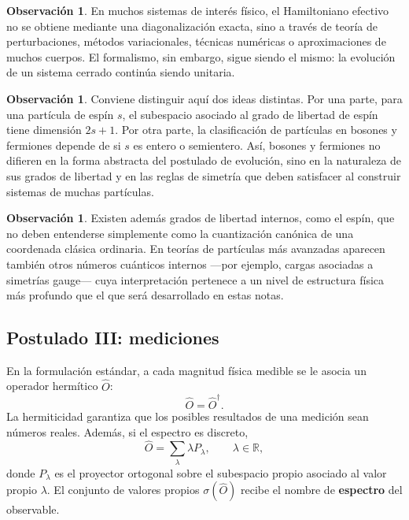 \documentclass[12pt,a4paper]{article}
\theoremstyle{definition}
\newtheorem{observacion}[definicion]{Observación}
\theoremstyle{plain}
\theoremstyle{remark}
\newcommand{\R}{\mathbb{R}}
\providecommand{\op}[1]{\hat{#1}}
\begin{document}
\begin{observacion}
En muchos sistemas de interés físico, el Hamiltoniano efectivo no se obtiene mediante una diagonalización exacta, sino a través de teoría de perturbaciones, métodos variacionales, técnicas numéricas o aproximaciones de muchos cuerpos. El formalismo, sin embargo, sigue siendo el mismo: la evolución de un sistema cerrado continúa siendo unitaria.
\end{observacion}

\begin{observacion}
Conviene distinguir aquí dos ideas distintas. Por una parte, para una partícula de espín $s$, el subespacio asociado al grado de libertad de espín tiene dimensión $2s+1$. Por otra parte, la clasificación de partículas en bosones y fermiones depende de si $s$ es entero o semientero. Así, bosones y fermiones no difieren en la forma abstracta del postulado de evolución, sino en la naturaleza de sus grados de libertad y en las reglas de simetría que deben satisfacer al construir sistemas de muchas partículas.
\end{observacion}

\begin{observacion}
Existen además grados de libertad internos, como el espín, que no deben entenderse simplemente como la cuantización canónica de una coordenada clásica ordinaria. En teorías de partículas más avanzadas aparecen también otros números cuánticos internos ---por ejemplo, cargas asociadas a simetrías gauge--- cuya interpretación pertenece a un nivel de estructura física más profundo que el que será desarrollado en estas notas.
\end{observacion}

\subsection{Postulado III: mediciones}


En la formulación estándar, a cada magnitud física medible se le asocia un operador hermítico $\op{O}$:
\begin{equation*}
    \op{O}=\op{O}^\dagger.
\end{equation*}
La hermiticidad garantiza que los posibles resultados de una medición sean números reales. Además, si el espectro es discreto,
\begin{equation*}
    \op{O}=\sum_{\lambda}\lambda P_\lambda,
    \qquad \lambda\in\R,
\end{equation*}
donde $P_\lambda$ es el proyector ortogonal sobre el subespacio propio asociado al valor propio $\lambda$. El conjunto de valores propios $\sigma(\op{O})$ recibe el nombre de \textbf{espectro} del observable.
\end{document}
